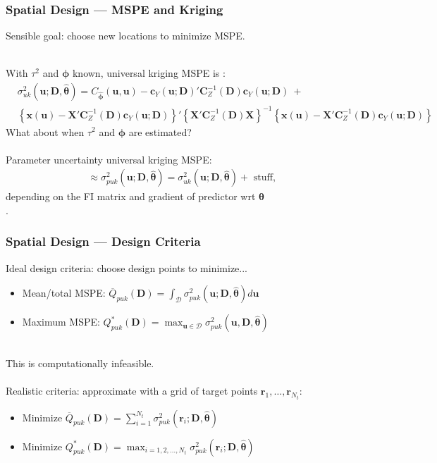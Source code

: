 \documentclass[xcolor=dvipsnames]{beamer}
\begin{document}
\begin{frame}
\frametitle{Spatial Design --- MSPE and Kriging}
Sensible goal: choose new locations to minimize MSPE. \\~\\

\pause

With $\tau^2$ and $\bm{\phi}$ known, universal kriging MSPE is {\footnotesize \citep*{cressie2011statistics}:}
{\footnotesize
\begin{align*}
& \sigma_{uk}^2(\bm{u};\bm{D}, \widehat{\bm{\theta}})=C_{\widehat{\bm{\phi}}}(\bm{u}, \bm{u}) - \bm{c}_Y(\bm{u};\bm{D})'\bm{C}_Z^{-1}(\bm{D})\bm{c}_Y(\bm{u};\bm{D}) \ + \\
& \left\{\bm{x}(\bm{u})  - \bm{X}'\bm{C}_Z^{-1}(\bm{D})\bm{c}_Y(\bm{u};\bm{D})\right\}'\left\{\bm{X}'\bm{C}_Z^{-1}(\bm{D})\bm{X}\right\}^{-1}\left\{\bm{x}(\bm{u})  - \bm{X}'\bm{C}_Z^{-1}(\bm{D})\bm{c}_Y(\bm{u};\bm{D})\right\}
\end{align*}
}
\pause
What about when $\tau^2$ and $\bm{\phi}$ are estimated? \pause\\~\\

Parameter uncertainty universal kriging MSPE:
\begin{align*}
\approx \sigma^2_{puk}(\bm{u};\bm{D},\widehat{\bm{\theta}}) = \sigma^2_{uk}(\bm{u};\bm{D},\widehat{\bm{\theta}}) + \mbox{ stuff, }
\end{align*}
depending on the FI matrix and gradient of predictor wrt $\bm{\theta}$\\
\citep*{zimmerman1992mean,abt1999estimating}.
\end{frame}

\begin{frame}
\frametitle{Spatial Design --- Design Criteria}
Ideal design criteria: choose design points to minimize...
\begin{itemize}
\item Mean/total MSPE: $\overline{Q}_{puk}(\bm{D}) = \int_{\mathcal{D}}\sigma_{puk}^2(\bm{u};\bm{D},\widehat{\bm{\theta}})d\bm{u}$
\item Maximum MSPE: $Q^*_{puk}(\bm{D}) = \max_{\bm{u}\in\mathcal{D}}\sigma_{puk}^2(\bm{u},\bm{D},\widehat{\bm{\theta}})$\\~\\
\end{itemize}

\pause

This is computationally infeasible. \\~\\

Realistic criteria: approximate with a grid of target points $\bm{r}_1,\dots,\bm{r}_{N_t}$:
\begin{itemize}
\item Minimize $\overline{Q}_{puk}(\bm{D}) = \sum_{i=1}^{N_t}\sigma_{puk}^2(\bm{r}_i;\bm{D},\widehat{\bm{\theta}})$
\item Minimize $Q_{puk}^*(\bm{D}) = \max_{i=1,2,\dots,N_t}\sigma_{puk}^2(\bm{r}_i;\bm{D},\widehat{\bm{\theta}})$
\end{itemize}

\end{frame}
\end{document}
